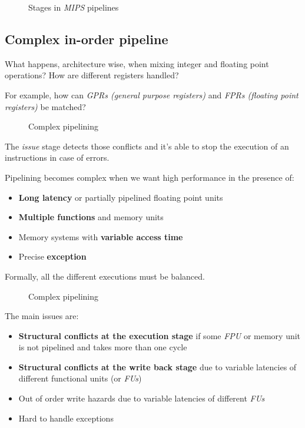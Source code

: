 \documentclass[english]{article}
\begin{document}
\begin{figure}[htbp]
  \bigskip
  \centering
  \caption{Stages in \textit{MIPS} pipelines}
  \label{fig:mips-pipeline-stages}
  \bigskip
\end{figure}

\subsection{Complex in-order pipeline}

What happens, architecture wise, when mixing integer and floating point operations?
How are different registers handled?

For example, how can \textit{GPRs (general purpose registers)} and \textit{FPRs (floating point registers)} be matched?

\begin{figure}[htbp]
  \bigskip
  \centering
  \caption{Complex pipelining}
  \label{fig:complex-pipelining}
  \bigskip
\end{figure}

The \textit{issue} stage detects those conflicts and it's able to stop the execution of an instructions in case of errors.

\bigskip
Pipelining becomes complex when we want high performance in the presence of:

\begin{itemize}
  \item \textbf{Long latency} or partially pipelined floating point units
  \item \textbf{Multiple functions} and memory units
  \item Memory systems with \textbf{variable access time}
  \item Precise \textbf{exception}
\end{itemize}

Formally, all the different executions must be balanced.

\begin{figure}[htbp]
  \bigskip
  \centering
  \caption{Complex pipelining}
  \label{fig:complex-pipelining-2}
  \bigskip
\end{figure}

\bigskip
The main issues are:
\begin{itemize}
  \item \textbf{Structural conflicts at the execution stage} if some \textit{FPU} or memory unit is not pipelined and takes more than one cycle
  \item \textbf{Structural conflicts at the write back stage} due to variable latencies of different functional units (or \textit{FUs})
  \item Out of order write hazards due to variable latencies of different \textit{FUs}
  \item Hard to handle exceptions
\end{itemize}
\end{document}
